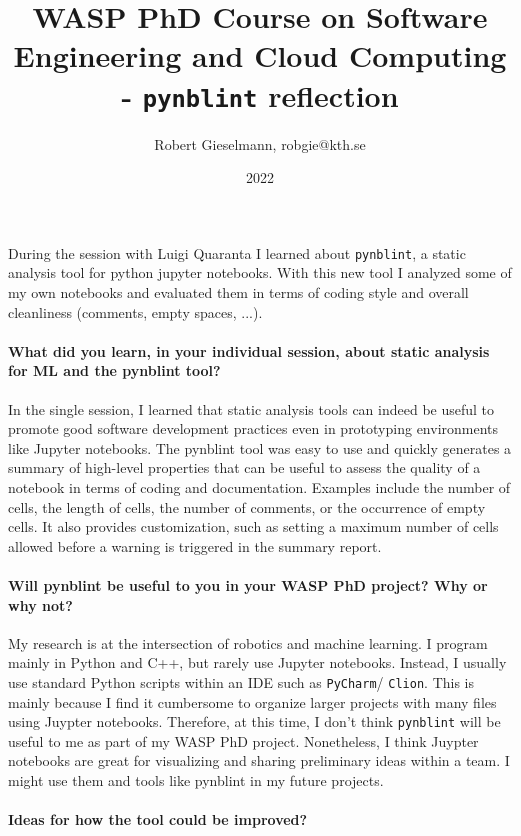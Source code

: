 \documentclass{article}
\title{WASP PhD Course on Software Engineering and Cloud Computing - \texttt{pynblint} reflection}
\author{Robert Gieselmann, robgie@kth.se}
\date{2022}
\begin{document}
\maketitle

\noindent During the session with Luigi Quaranta I learned about \texttt{pynblint}, a static analysis tool for 
python jupyter notebooks. With this new tool I analyzed some of my own notebooks and evaluated them in terms of coding style and overall cleanliness (comments, empty spaces, ...).    

\paragraph{What did you learn, in your individual session, about static analysis for ML and the pynblint tool?}

In the single session, I learned that static analysis tools can indeed be useful to promote good software development practices even in prototyping environments like Jupyter notebooks. The pynblint tool was easy to use and quickly generates a summary of high-level properties that can be useful to assess the quality of a notebook in terms of coding and documentation. Examples include the number of cells, the length of cells, the number of comments, or the occurrence of empty cells. It also provides customization, such as setting a maximum number of cells allowed before a warning is triggered in the summary report. 

\paragraph{Will pynblint be useful to you in your WASP PhD project? Why or why not?}

My research is at the intersection of robotics and machine learning. I program mainly in Python and C++, but rarely use Jupyter notebooks. Instead, I usually use standard Python scripts within an IDE such as \texttt{PyCharm}/ \texttt{Clion}. This is mainly because I find it cumbersome to organize larger projects with many files using Juypter notebooks. Therefore, at this time, I don't think \texttt{pynblint} will be useful to me as part of my WASP PhD project. Nonetheless, I think Juypter notebooks are great for visualizing and sharing preliminary ideas within a team. I might use them and tools like pynblint in my future projects.   

\paragraph{Ideas for how the tool could be improved?}
\end{document}
